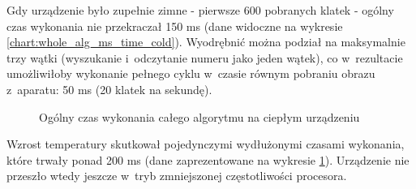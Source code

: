 Gdy urządzenie było zupełnie zimne - pierwsze 600 pobranych klatek - 
ogólny czas wykonania nie przekraczał 150 ms (dane widoczne na wykresie
\ref{chart:whole_alg_ms_time_cold}). Wyodrębnić można podział na 
maksymalnie trzy wątki (wyszukanie i~odczytanie numeru jako jeden wątek), 
co w~rezultacie umożliwiłoby wykonanie pełnego cyklu w~czasie równym
pobraniu obrazu z~aparatu: 50 ms (20 klatek na sekundę).

\begin{figure}[h!]
	\begin{center}
	\end{center}
	\caption{Ogólny czas wykonania całego algorytmu na ciepłym urządzeniu}
	\label{chart:whole_alg_ms_time_warm}
\end{figure}

Wzrost temperatury skutkował pojedynczymi wydłużonymi czasami wykonania,
które trwały ponad 200 ms (dane zaprezentowane na wykresie
\ref{chart:whole_alg_ms_time_warm}). Urządzenie nie przeszło wtedy
jeszcze w~tryb zmniejszonej częstotliwości procesora.


